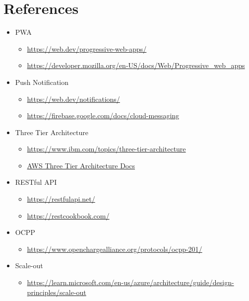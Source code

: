\section{References}
\begin{itemize}
    \item PWA
    \begin{itemize}
        \item \url{https://web.dev/progressive-web-apps/}
        \item \url{https://developer.mozilla.org/en-US/docs/Web/Progressive_web_apps}
    \end{itemize}
    \item Push Notification
    \begin{itemize}
        \item \url{https://web.dev/notifications/}
        \item \url{https://firebase.google.com/docs/cloud-messaging}
    \end{itemize}
    \item Three Tier Architecture
    \begin{itemize}
        \item \url{https://www.ibm.com/topics/three-tier-architecture}
        \item \href{https://docs.aws.amazon.com/whitepapers/latest/serverless-multi-tier-architectures-api-gateway-lambda/three-tier-architecture-overview.html}{AWS Three Tier Architecture Docs}
    \end{itemize}
    \item RESTful API
    \begin{itemize}
        \item \url{https://restfulapi.net/}
        \item \url{https://restcookbook.com/}
    \end{itemize}
    \item OCPP
    \begin{itemize}
        \item \url{https://www.openchargealliance.org/protocols/ocpp-201/}
    \end{itemize}
    \item Scale-out
    \begin{itemize}
        \item \url{https://learn.microsoft.com/en-us/azure/architecture/guide/design-principles/scale-out}
    \end{itemize}
\end{itemize}